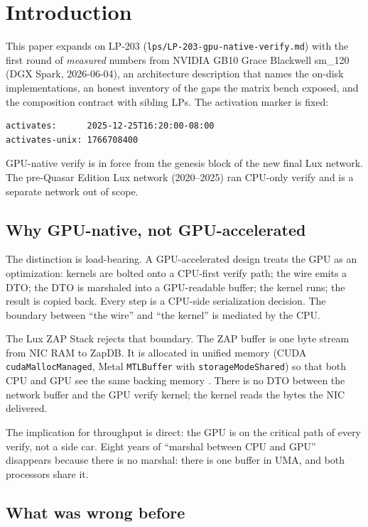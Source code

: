 \section{Introduction}

This paper expands on LP-203
(\texttt{lps/LP-203-gpu-native-verify.md}) with the first round of
\emph{measured} numbers from NVIDIA GB10 Grace Blackwell sm\_120
(DGX Spark, 2026-06-04), an architecture description that names
the on-disk implementations, an honest inventory of the gaps the
matrix bench exposed, and the composition contract with sibling
LPs. The activation marker is fixed:

\begin{verbatim}
activates:      2025-12-25T16:20:00-08:00
activates-unix: 1766708400
\end{verbatim}

GPU-native verify is in force from the genesis block of the new
final Lux network. The pre-Quasar Edition Lux network
(\num{2020}--\num{2025}) ran CPU-only verify and is a separate
network out of scope.

\subsection{Why GPU-native, not GPU-accelerated}

The distinction is load-bearing. A GPU-accelerated design treats
the GPU as an optimization: kernels are bolted onto a CPU-first
verify path; the wire emits a DTO; the DTO is marshaled into a
GPU-readable buffer; the kernel runs; the result is copied back.
Every step is a CPU-side serialization decision. The boundary
between ``the wire'' and ``the kernel'' is mediated by the CPU.

The Lux ZAP Stack \cite{lp200} rejects that boundary. The ZAP
buffer is one byte stream from NIC RAM to ZapDB. It is allocated
in unified memory (CUDA \texttt{cudaMallocManaged}, Metal
\texttt{MTLBuffer} with \texttt{storageModeShared}) so that both
CPU and GPU see the same backing memory \cite{cudaumat}. There is
no DTO between the network buffer and the GPU verify kernel; the
kernel reads the bytes the NIC delivered.

The implication for throughput is direct: the GPU is on the
critical path of every verify, not a side car. Eight years of
``marshal between CPU and GPU'' disappears because there is no
marshal: there is one buffer in UMA, and both processors share it.

\subsection{What was wrong before}

